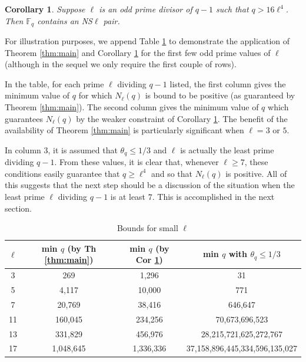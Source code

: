\documentclass[12pt]{amsart}
\newtheorem{cor}[thm]{Corollary}
\numberwithin{equation}{section}
\newcommand{\F}{\mathbb{F}_q}
\begin{document}
\begin{cor}\label{Npos}
Suppose $\ell$ is an odd prime divisor of $q-1$ such that $q > 16 \ell^4$. Then $\F$ contains an  NS$\ell$ pair.
\end{cor}
  For illustration purposes, we append  Table \ref{smalltable} to demonstrate the application of Theorem \ref{thm:main} and Corollary \ref{Npos} for  the first few odd prime values of  $\ell$ (although in the sequel we only  require the first couple of rows).  
  
   In the table,  for each prime $\ell$ dividing $q-1$ listed, the first column  gives the minimum value of $q$ for which $N_\ell(q)$ is bound to be positive (as guaranteed by Theorem \ref{thm:main}). The second column gives the minimum value of $q$ which guarantees $N_\ell(q)$ by the weaker constraint of Corollary \ref{Npos}.    The benefit of the availability of Theorem \ref{thm:main} is particularly significant  when $\ell= 3$ or $5$.
   
   In column 3, it is assumed that $ \theta_q \le 1/3$ and $\ell$ is actually the least prime dividing $q-1$.  From these values, it is clear that, whenever $\ell \ge 7$, these conditions easily guarantee that $q \ge \ell^4$ and so that $N_\ell(q)$ is positive.  All of this suggests that the next step should be a discussion of the situation when the least prime $\ell$ dividing $q-1$ is at least $7$.  This is accomplished in the next section.
  
\begin{table}[h]\label{smalltable}
\centering 
\caption{Bounds for small $\ell$}
\begin{tabular}{c|c|c|c}   
$\ell$ 
& min $q$ (by Th \ref{thm:main})
& min $q$ (by Cor \ref{Npos}) 
& min $q$ with $\theta_q \le 1/3$  \\[2pt]
 \hline
3  & 269          & 1,296        & 31 \\
5  & 4,117        & 10,000       & 771 \\
7  & 20,769       & 38,416       & 646,647 \\
11 & 160,045      & 234,256      & 70,673,696,523\\
13 & 331,829      & 456,976       & 28,215,721,625,272,767 \\
17 & 1,048,645    & 1,336,336     & 37,158,896,445,334,596,135,027\\
\end{tabular}
\end{table}

\bigskip
\end{document}
